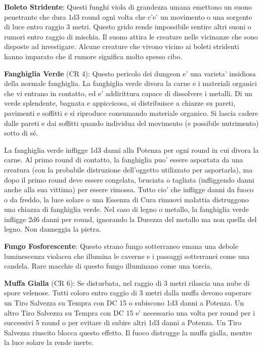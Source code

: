 \documentclass[a4paper,11pt,twoside,openany]{book}
\begin{document}
{\textbf{Boleto Stridente}: Questi funghi viola di grandezza umana emettono un suono penetrante che dura 1d3 round ogni volta che c'e' un movimento o una sorgente di luce entro raggio 3 metri. Questo grido rende impossibile sentire altri suoni o rumori entro raggio di mischia. Il suono attira le creature nelle vicinanze che sono disposte ad investigare. Alcune creature che vivono vicino ai boleti stridenti hanno imparato che il rumore significa molto spesso cibo.

\textbf{Fanghiglia Verde} (CR 4): Questo pericolo dei dungeon e' una varieta' insidiosa della normale fanghiglia. La fanghiglia verde divora la carne e i materiali organici che vi entrano in contatto, ed e' addirittura capace di dissolvere i metalli. Di un verde splendente, bagnata e appiccicosa, si distribuisce a chiazze su pareti, pavimenti e soffitti e si riproduce consumando materiale organico. Si lascia cadere dalle pareti e dai soffitti quando individua del movimento (e possibile nutrimento) sotto di sé.

La fanghiglia verde infligge 1d3 danni alla Potenza per ogni round in cui divora la carne. Al primo round di contatto, la fanghiglia puo' essere asportata da una creatura (con la probabile distruzione dell'oggetto utilizzato per asportarla), ma dopo il primo round deve essere congelata, bruciata o tagliata (infliggendo danni anche alla sua vittima) per essere rimossa. Tutto cio' che infligge danni da fuoco o da freddo, la luce solare o una Essenza di Cura rimuovi malattia distruggono una chiazza di fanghiglia verde. Nel caso di legno o metallo, la fanghiglia verde infligge 2d6 danni per round, ignorando la Durezza del metallo ma non quella del legno. Non danneggia la pietra.

\textbf{Fungo Fosforescente}: Questo strano fungo sotterraneo emana una debole luminescenza violacea che illumina le caverne e i passaggi sotterranei come una candela. Rare macchie di questo fungo illuminano come una torcia.

\textbf{Muffa Gialla} (CR 6): Se disturbata, nel raggio di 3 metri rilascia una nube di spore velenose. Tutti coloro entro raggio di 3 metri dalla muffa devono superare un Tiro Salvezza su Tempra con DC 15 o subiscono 1d3 danni a Potenza. Un altro Tiro Salvezza su Tempra con DC 15 e' necessario una volta per round per i successivi 5 round o per evitare di subire altri 1d3 danni a Potenza. Un Tiro Salvezza riuscito blocca questo effetto. Il fuoco distrugge la muffa gialla, mentre la luce solare la rende inerte.

}
\end{document}
